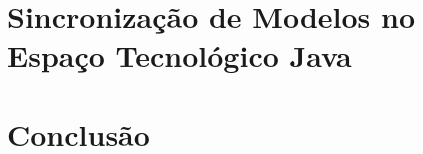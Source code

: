 \documentclass[cic,resumo-unibral]{iiufrgs}
\begin{document}
\begin{extendedsummary}


\section{Sincronização de Modelos no Espaço Tecnológico Java}

\section{Conclusão}


%




\end{extendedsummary}
\end{document}

